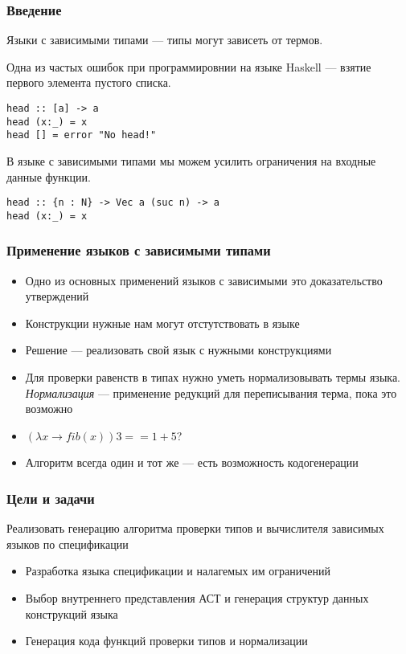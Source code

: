 
\begin{frame}[fragile]
\frametitle{Введение}

Языки с зависимыми типами --- типы могут зависеть от термов.

Одна из частых ошибок при программировнии на языке Haskell --- взятие первого элемента пустого списка.

\begin{verbatim}
head :: [a] -> a
head (x:_) = x
head [] = error "No head!"
\end{verbatim}

В языке с зависимыми типами мы можем усилить ограничения на входные данные функции.

\begin{verbatim}
head :: {n : N} -> Vec a (suc n) -> a
head (x:_) = x
\end{verbatim}

\end{frame}

\begin{frame}
\frametitle{Применение языков с зависимыми типами}

\begin{itemize}
\item Одно из основных применений языков с зависимыми это доказательство утверждений
\item Конструкции нужные нам могут отстутствовать в языке
\item Решение --- реализовать свой язык с нужными конструкциями
\item Для проверки равенств в типах нужно уметь нормализовывать термы языка.
\textit{Нормализация} --- применение редукций для переписывания терма, пока это возможно
\item $(\lambda x \rightarrow fib(x)) 3 == 1 + 5$?
\item Алгоритм всегда один и тот же --- есть возможность кодогенерации
\end{itemize}
\end{frame}

\begin{frame}
\frametitle{Цели и задачи}
Реализовать генерацию алгоритма проверки типов и вычислителя зависимых языков по спецификации

\begin{itemize}
\item Разработка языка спецификации и налагемых им ограничений
\item Выбор внутреннего представления АСТ и генерация структур данных конструкций языка
\item Генерация кода функций проверки типов и нормализации
\end{itemize}
\end{frame}

